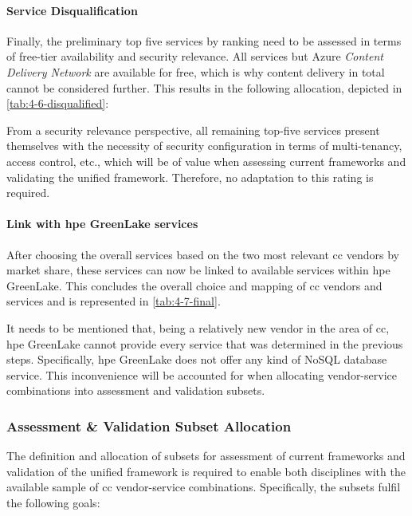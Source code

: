 \paragraph{Service Disqualification}
Finally, the preliminary top five services by ranking need to be assessed in terms of free-tier availability and security relevance. All services but Azure \textit{Content Delivery Network} are available for free, which is why content delivery in total cannot be considered further. This results in the following allocation, depicted in \autoref{tab:4-6-disqualified}:


From a security relevance perspective, all remaining top-five services present themselves with the necessity of security configuration in terms of multi-tenancy, access control, etc., which will be of value when assessing current frameworks and validating the unified framework. Therefore, no adaptation to this rating is required.

\paragraph{Link with \acs{hpe} GreenLake services}
After choosing the overall services based on the two most relevant \ac{cc} vendors by market share, these services can now be linked to available services within \acs{hpe} GreenLake. This concludes the overall choice and mapping of \ac{cc} vendors and services and is represented in \autoref{tab:4-7-final}.


It needs to be mentioned that, being a relatively new vendor in the area of \ac{cc}, \acs{hpe} GreenLake cannot provide every service that was determined in the previous steps. Specifically, \acs{hpe} GreenLake does not offer any kind of NoSQL database service. This inconvenience will be accounted for when allocating vendor-service combinations into assessment and validation subsets.

\subsubsection{Assessment \& Validation Subset Allocation}

The definition and allocation of subsets for assessment of current frameworks and validation of the unified framework is required to enable both disciplines with the available sample of \ac{cc} vendor-service combinations. Specifically, the subsets fulfil the following goals:

